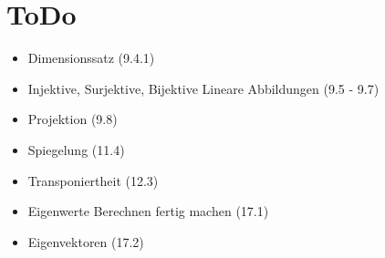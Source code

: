 \chapter{ToDo}

\begin{itemize}
    \item Dimensionssatz (9.4.1)
    \item Injektive, Surjektive, Bijektive Lineare Abbildungen (9.5 - 9.7)
    \item Projektion (9.8)
    \item Spiegelung (11.4)
    \item Transponiertheit (12.3)
    \item Eigenwerte Berechnen fertig machen (17.1)
    \item Eigenvektoren (17.2)
\end{itemize}
